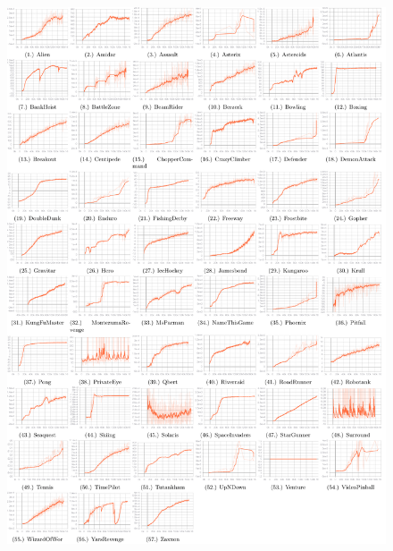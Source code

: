 \begin{figure}[t]
    \centering
    \vspace{-1.3cm}
    \includegraphics[width=1.0\linewidth]{body/all_fig3.pdf}
\end{figure}

\clearpage

